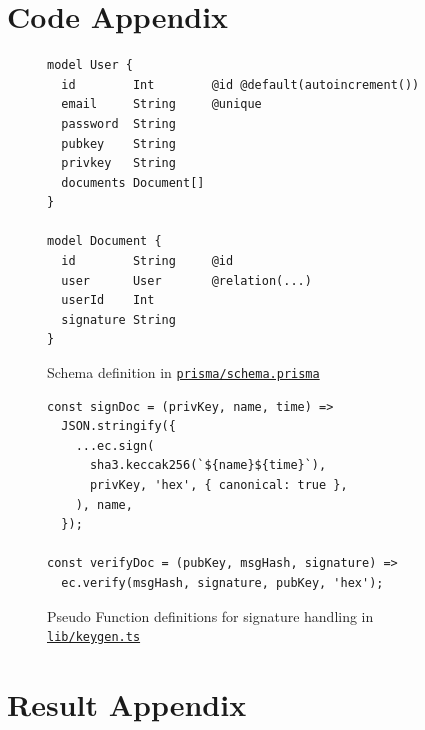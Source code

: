 \documentclass[a4,12pt]{article}
\begin{document}

\newpage
\printbibliography

\appendix

\newpage
{}
\section{Code Appendix}

\begin{figure}[h]
\centering
\begin{verbatim}
model User {
  id        Int        @id @default(autoincrement())
  email     String     @unique
  password  String
  pubkey    String
  privkey   String
  documents Document[]
}

model Document {
  id        String     @id
  user      User       @relation(...)
  userId    Int
  signature String
}
\end{verbatim}
\caption{Schema definition in \href{https://github.com/ineshbose/authentica/blob/9ceaf3575cc26b7bb5be035e24d779237d829de4/prisma/schema.prisma\#L10}{\texttt{prisma/schema.prisma}}}
\label{fig:schema}
\end{figure}

\begin{figure}[h]
\centering
\begin{verbatim}
const signDoc = (privKey, name, time) =>
  JSON.stringify({
    ...ec.sign(
      sha3.keccak256(`${name}${time}`),
      privKey, 'hex', { canonical: true },
    ), name,
  });

const verifyDoc = (pubKey, msgHash, signature) =>
  ec.verify(msgHash, signature, pubKey, 'hex');
\end{verbatim}
\caption{Pseudo Function definitions for signature handling in \href{https://github.com/ineshbose/authentica/blob/9ceaf3575cc26b7bb5be035e24d779237d829de4/lib/keygen.ts\#L17}{\texttt{lib/keygen.ts}}}
\label{fig:signature}
\end{figure}

\newpage
\section{Result Appendix}
\end{document}

